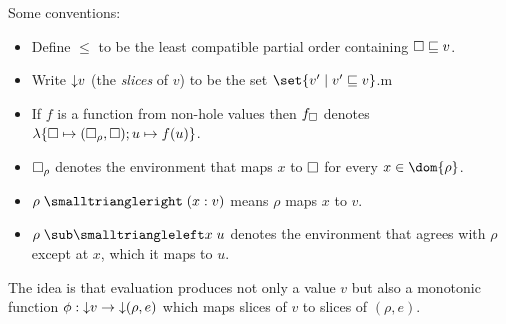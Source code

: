 

Some conventions:
\begin{itemize}
\item Define $\leq$ to be the least compatible partial order containing $\square \sqsubseteq v$.
\item Write ${\downarrow}{v}$ (the \emph{slices} of $v$) to be the set $\set{v' \mid v' \leq v}$.m
\item If $f$ is a function from non-hole values then $f_{\square}$ denotes $\lambda\{\square \mapsto (\square_\rho,\square); u \mapsto f(u)\}$.
\item $\square_\rho$ denotes the environment that maps $x$ to $\square$ for every $x \in \dom{\rho}$.
\item $\envLookup{\rho}{x}{v}$ means $\rho$ maps $x$ to $v$.
\item $\envLookupBwd{\rho}{x}{u}$ denotes the environment that agrees with $\rho$ except at $x$, which it maps to $u$.
\end{itemize}

The idea is that evaluation produces not only a value $v$ but also a monotonic function $\phi: {\downarrow}{v} \to {\downarrow}{(\rho,e)}$ which maps slices of $v$ to slices of $(\rho,e)$.


